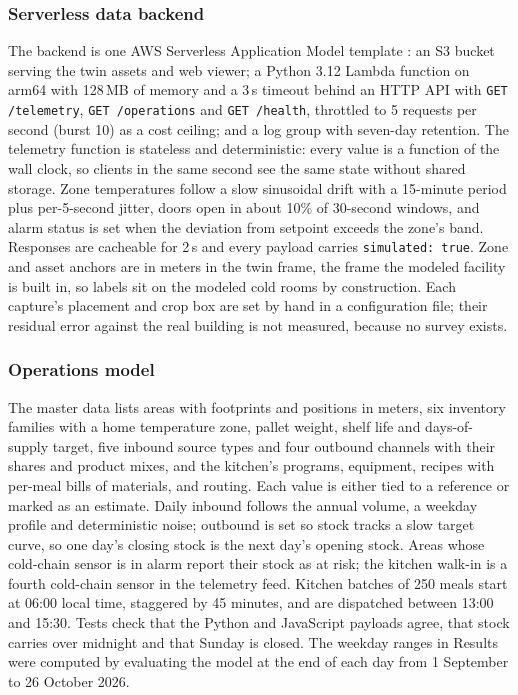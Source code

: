 \documentclass{article}
\newcommand{\code}[1]{\texttt{\small #1}}
\begin{document}
\subsubsection{Serverless data backend}
The backend is one AWS Serverless Application Model template \cite{awssam}: an
S3 bucket serving the twin assets and web viewer; a Python 3.12 Lambda
function on arm64 with 128\,MB of memory and a 3\,s timeout behind an HTTP API
with \code{GET /telemetry}, \code{GET /operations} and \code{GET /health}, throttled to 5 requests per
second (burst 10) as a cost ceiling; and a log group with seven-day retention.
The telemetry function is stateless and deterministic: every value is a
function of the wall clock, so clients in the same second see the same state
without shared storage. Zone temperatures follow a slow sinusoidal drift with
a 15-minute period plus per-5-second jitter, doors open in about 10\% of
30-second windows, and alarm status is set when the deviation from setpoint
exceeds the zone's band. Responses are cacheable for 2\,s and every payload
carries \code{simulated: true}. Zone and asset anchors are in meters in the
twin frame, the frame the modeled facility is built in, so labels sit on the
modeled cold rooms by construction. Each capture's placement and crop box are
set by hand in a configuration file; their residual error against the real
building is not measured, because no survey exists.

\subsubsection{Operations model}
The master data lists areas with footprints and positions in meters, six
inventory families with a home temperature zone, pallet weight, shelf life and
days-of-supply target, five inbound source types and four outbound channels
with their shares and product mixes, and the kitchen's programs, equipment,
recipes with per-meal bills of materials, and routing. Each value is either
tied to a reference or marked as an estimate. Daily inbound follows the annual
volume, a weekday profile and deterministic noise; outbound is set so stock
tracks a slow target curve, so one day's closing stock is the next day's
opening stock. Areas whose cold-chain sensor is in alarm report their stock as
at risk; the kitchen walk-in is a fourth cold-chain sensor in the telemetry
feed. Kitchen batches of 250 meals start at 06:00 local time, staggered by 45
minutes, and are dispatched between 13:00 and 15:30. Tests check that the
Python and JavaScript payloads agree, that stock carries over midnight and that
Sunday is closed. The weekday ranges in Results were computed by evaluating the
model at the end of each day from 1 September to 26 October 2026.
\end{document}
